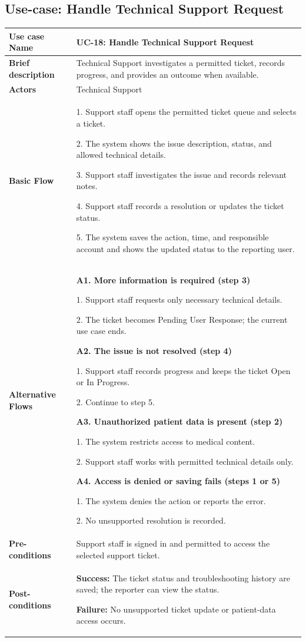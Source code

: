 \clearpage
\subsection{Use-case: Handle Technical Support Request}
\label{uc:uc-18}
\begin{longtable}{|p{}|p{}|}
\hline
\textbf{Use case Name} & UC-18: Handle Technical Support Request \\ \hline
\textbf{Brief description} & Technical Support investigates a permitted ticket, records progress, and provides an outcome when available. \\ \hline
\textbf{Actors} & Technical Support \\ \hline
\textbf{Basic Flow} &
1. Support staff opens the permitted ticket queue and selects a ticket.\par
2. The system shows the issue description, status, and allowed technical details.\par
3. Support staff investigates the issue and records relevant notes.\par
4. Support staff records a resolution or updates the ticket status.\par
5. The system saves the action, time, and responsible account and shows the updated status to the reporting user.
\\ \hline
\textbf{Alternative Flows} &
\textbf{A1. More information is required (step 3)}\par
1. Support staff requests only necessary technical details.\par
2. The ticket becomes Pending User Response; the current use case ends.
\par\smallskip
\textbf{A2. The issue is not resolved (step 4)}\par
1. Support staff records progress and keeps the ticket Open or In Progress.\par
2. Continue to step 5.
\par\smallskip
\textbf{A3. Unauthorized patient data is present (step 2)}\par
1. The system restricts access to medical content.\par
2. Support staff works with permitted technical details only.
\par\smallskip
\textbf{A4. Access is denied or saving fails (steps 1 or 5)}\par
1. The system denies the action or reports the error.\par
2. No unsupported resolution is recorded.
\\ \hline
\textbf{Pre-conditions} & Support staff is signed in and permitted to access the selected support ticket. \\ \hline
\textbf{Post-conditions} & \textbf{Success:} The ticket status and troubleshooting history are saved; the reporter can view the status.\par
\textbf{Failure:} No unsupported ticket update or patient-data access occurs. \\ \hline
\end{longtable}
